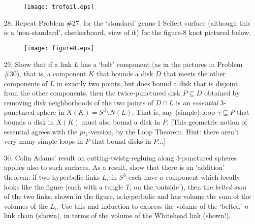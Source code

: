 \documentclass[12pt]{article}
\begin{document}
\begin{description}
\vspace{-.1in}

\begin{figure}[h]
\begin{center}
\texttt{[image: trefoil.eps]}
\end{center}
\end{figure} 

\vspace{-.3in}

\item{28.} Repeat Problem \#27, for the `standard' genus-1 Seifert surface 
(although this is a `non-standard', checkerboard, view of it) for the figure-8 knot pictured below.


\vspace{-.1in}

\begin{figure}[h]
\begin{center}
\texttt{[image: figure8.eps]}
\end{center}
\end{figure} 

\vspace{-.3in}

\vfill\eject

\item{29.} Show that if a link $L$ has a `belt' component (as in the pictures in Problem \#30), 
that is, a component $K$ that bounds a disk $D$ that meets the
other components of $L$ in exactly two points, but does  bound a disk that is disjoint from 
the other components, then the twice-punctured disk $P\subseteq D$ obtained by removing
disk neighborhoods of the two points of $D\cap L$ is an {\it essential} 3-punctured sphere in 
$X(K)=S^3\setminus N(L)$. That is, any (simple) loop
$\gamma\subseteq P$ that bounds a disk in $X(K)$ must also bound a disk in $P$. [This geometric notion of essential
agrees with the $pi_1$-version, by the Loop Theorem. Hint: there aren't very many simple
loops in $P$ that  bound disks in $P$...]


\item{30.} Colin Adams' result on cutting-twistg-regluing along 3-punctured spheres applies
also to  such surfaces. As a result, show that there is an `addition'
theorem: if two hyperbolic links $L_i$ in $S^3$ each have a component which locally looks like the figure
(each with a tangle $T_i$ on the `outside'), then the {\it belted sum} of the two links,
shown in the figure, is hyperbolic and has volume the sum of the volumes of the $L_i$. 
Use this and induction to express the volume of the `belted' $n$-link chain (shown), in terms of the 
volume of the Whitehead link (shown!).


\end{description}
\end{document}
